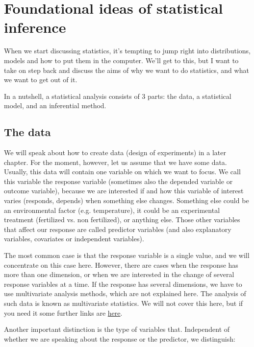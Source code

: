 \documentclass[a4paper,twoside]{tufte-book} %
\begin{document}
\chapter{Foundational ideas of statistical inference}

When we start discussing statistics, it's tempting to jump right into distributions, models and how to put them in the computer. We'll get to this, but I want to take on step back and discuss the aims of why we want to do statistics, and what we want to get out of it. 

In a nutshell, a statistical analysis consists of 3 parts: the data, a statistical model, and an inferential method. 

\section{The data}

We will speak about how to create data (design of experiments) in a later chapter. For the moment, however, let us assume that we have some data. Usually, this data will contain one variable on which we want to focus.  We call this variable the response variable (sometimes also the depended variable or outcome variable), because we are interested if and how this variable of interest varies (responds, depends) when something else changes. Something else could be an environmental factor (e.g. temperature), it could be an experimental treatment (fertilized vs. non fertilized), or anything else.  Those other variables that affect our response are called predictor variables (and also explanatory variables, covariates or independent variables). 

The most common case is that the response variable is a single value, and we will concentrate on this case here. However, there are cases when the response has more than one dimension, or when we are interested in the change of several response variables at a time. {If the response has several dimensions, we have to use multivariate analysis methods, which are not explained here.} The analysis of such data is known as multivariate statistics. We will not cover this here, but if you need it some further links are \href{http://biometry.github.io/APES/Stats/stats50-MultivariateStatistics.html}{here}.

Another important distinction is the type of variables that. Independent of whether we are speaking about the response or the predictor, we distinguish: 
\end{document}
